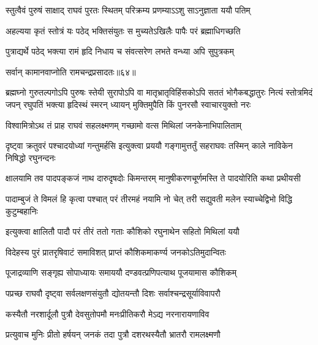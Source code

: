 \twolineshloka
{स्तुत्वैवं पुरुषं साक्षाद् राघवं पुरतः स्थितम्}
{परिक्रम्य प्रणम्याऽऽशु साऽनुज्ञाता ययौ पतिम्} %

\twolineshloka
{अहल्यया कृतं स्तोत्रं यः पठेद् भक्तिसंयुतः}
{स मुच्यतेऽखिलैः पापैः परं ब्रह्माधिगच्छति} %

\twolineshloka
{पुत्राद्यर्थे पठेद् भक्त्या रामं हृदि निधाय च}
{संवत्सरेण लभते वन्ध्या अपि सुपुत्रकम्} %

{सर्वान् कामानवाप्नोति रामचन्द्रप्रसादतः॥६४॥} %


\fourlineindentedshloka
{ब्रह्मघ्नो गुरुतल्पगोऽपि पुरुषः स्तेयी सुरापोऽपि वा}
{मातृभ्रातृविहिंसकोऽपि सततं भोगैकबद्धातुरः}
{नित्यं स्तोत्रमिदं जपन् रघुपतिं भक्त्या हृदिस्थं स्मरन्}
{ध्यायन् मुक्तिमुपैति किं पुनरसौ स्वाचारयुक्तो नरः} %



\twolineshloka
{विश्वामित्रोऽथ तं प्राह राघवं सहलक्ष्मणम्}
{गच्छामो वत्स मिथिलां जनकेनाभिपालिताम्} %

\threelineshloka
{दृष्ट्वा क्रतुवरं पश्चादयोध्यां गन्तुमर्हसि}
{इत्युक्त्वा प्रययौ गङ्गामुत्तर्तुं सहराघवः}
{तस्मिन् काले नाविकेन निषिद्धो रघुनन्दनः} %


\fourlineindentedshloka
{क्षालयामि तव पादपङ्कजं}
{नाथ दारुदृषदोः किमन्तरम्}
{मानुषीकरणचूर्णमस्ति ते}
{पादयोरिति कथा प्रथीयसी} %

\fourlineindentedshloka
{पादाम्बुजं ते विमलं हि कृत्वा}
{पश्चात् परं तीरमहं नयामि}
{नो चेत् तरी सद्युवती मलेन}
{स्याच्चेद्विभो विद्धि कुटुम्बहानिः} %

\twolineshloka
{इत्युक्त्वा क्षालितौ पादौ परं तीरं ततो गताः}
{कौशिको रघुनाथेन सहितो मिथिलां ययौ} %

\twolineshloka
{विदेहस्य पुरं प्रातरृषिवाटं समाविशत्}
{प्राप्तं कौशिकमाकर्ण्य जनकोऽतिमुदान्वितः} %

\twolineshloka
{पूजाद्रव्याणि सङ्गृह्य सोपाध्यायः समाययौ}
{दण्डवत्प्रणिपत्याथ पूजयामास कौशिकम्} %

\twolineshloka
{पप्रच्छ राघवौ दृष्ट्वा सर्वलक्षणसंयुतौ}
{द्योतयन्तौ दिशः सर्वाश्चन्द्रसूर्याविवापरौ} %

\twolineshloka
{कस्यैतौ नरशार्दूलौ पुत्रौ देवसुतोपमौ}
{मनःप्रीतिकरौ मेऽद्य नरनारायणाविव} %

\twolineshloka
{प्रत्युवाच मुनिः प्रीतो हर्षयन् जनकं तदा}
{पुत्रौ दशरथस्यैतौ भ्रातरौ रामलक्ष्मणौ} %

